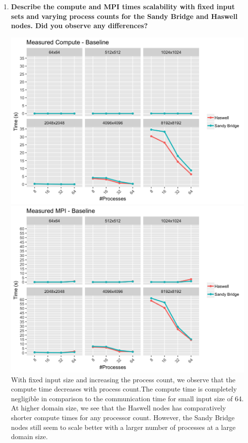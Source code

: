 \documentclass[10pt, letterpaper, twoside]{article}
\begin{document}
\begin{titlepage}
\begin{enumerate}
\item\textbf{Describe the compute and MPI times scalability with fixed input sets and varying process counts for the Sandy Bridge and Haswell nodes. Did you observe any differences?} 

\includegraphics[scale = 0.18]{Baseline_Measured-Compute_InputSize.png}
\includegraphics[scale = 0.18]{Baseline_Measured-MPI_InputSize.png}
\\
With fixed input size and increasing the process count, we observe that the compute time decreases with process count.The compute time is completely negligible in comparison to the communication time for small input size of 64. At higher domain size, we see that the Haswell nodes has comparatively shorter compute times for any processor count. However, the Sandy Bridge nodes still seem to scale better with a larger number of processes at a large domain size.


\end{enumerate}
\end{titlepage}
\end{document}
